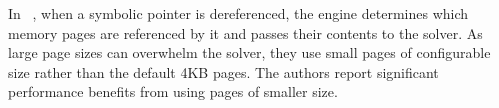 In {\sc \stwoe}~\cite{CKC-TOCS12}, when a symbolic pointer is dereferenced, the engine determines which memory pages are referenced by it and passes their contents to the solver. As large page sizes can overwhelm the solver, they use small pages of configurable size rather than the default 4KB pages. The authors report significant performance benefits from using pages of smaller size.

